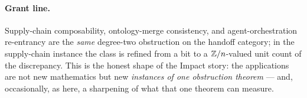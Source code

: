 \paragraph{Grant line.} Supply-chain composability, ontology-merge consistency,
and agent-orchestration re-entrancy are the \emph{same} degree-two obstruction on
the handoff category; in the supply-chain instance the class is refined from a
bit to a $\mathbb{Z}/n$-valued unit count of the discrepancy. This is the honest shape of
the Impact story: the applications are not new mathematics but new
\emph{instances of one obstruction theorem} --- and, occasionally, as here, a
sharpening of what that one theorem can measure.
